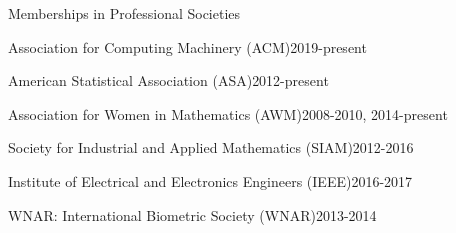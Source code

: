 \documentclass{resume} %
\begin{document}

\begin{rSection}{Memberships in Professional Societies}

\begin{esSubsection}{Association for Computing Machinery }{(ACM)}{2019-present}{}{}
\end{esSubsection}

\begin{esSubsection}{American Statistical Association }{(ASA)}{2012-present}{}{}
\end{esSubsection}

\begin{esSubsection}{Association for Women in Mathematics }{(AWM)}{2008-2010, 2014-present}{}{}
\end{esSubsection}

\begin{esSubsection}{Society for Industrial and Applied Mathematics }{(SIAM)}{2012-2016}{}{}
\end{esSubsection}


\begin{esSubsection}{Institute of Electrical and Electronics Engineers }{(IEEE)}{2016-2017}{}{}
\end{esSubsection}

\begin{esSubsection}{WNAR: International Biometric Society }{(WNAR)}{2013-2014}{}{}
\end{esSubsection}


\end{rSection}



\clearpage
\end{document}
